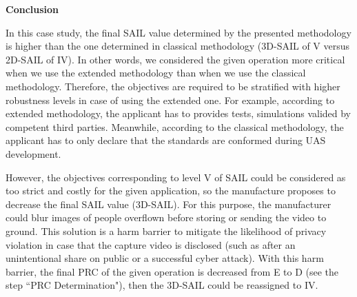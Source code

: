 \documentclass[a4paper, 10, conference]{ieeeconf}  %
\begin{document}
\textbf{Conclusion}

In this case study, the final SAIL value determined by the presented methodology is higher than the one determined in classical methodology (3D-SAIL of V versus 2D-SAIL of IV). In other words, we considered the given operation more critical when we use the extended methodology than when we use the classical methodology. Therefore, the objectives are required to be stratified with higher robustness levels in case of using the extended one. For example, according to extended methodology, the applicant has to provides tests, simulations valided by competent third parties. Meanwhile, according to the classical methodology, the applicant has to only declare that the standards are conformed during UAS development.

However, the objectives corresponding to level V of SAIL could be considered as too strict and costly for the given application, so the manufacture proposes to decrease the final SAIL value (3D-SAIL). For this purpose, the manufacturer could blur images of people overflown before storing or sending the video to ground. This solution is a harm barrier to mitigate the likelihood of privacy violation in case that the capture video is disclosed (such as after an unintentional share on public or a successful cyber attack). With this harm barrier, the final PRC of the given operation is decreased from E to D (see the step ``PRC Determination"), then the 3D-SAIL could be reassigned to IV.


 
\end{document}
